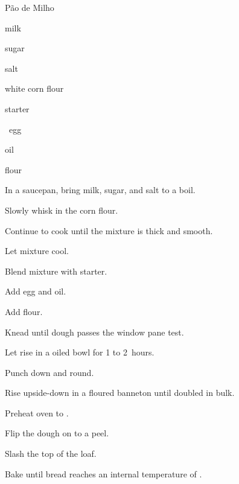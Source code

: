 \begin{recipe}{P\~ao de Milho}{}{}

\begin{ingredients}
\item {} milk
\item \C{\quarter} sugar
\item {} salt
\item {} white corn flour
\item {} starter
\item \half{}~egg
\item {} oil
\item {} flour
\end{ingredients}

\begin{directions}
\item In a saucepan, bring milk, sugar, and salt to a boil.
\item Slowly whisk in the corn flour.
\item Continue to cook until the mixture is thick and smooth.
\item Let mixture cool.
\item Blend mixture with starter.
\item Add egg and oil.
\item Add flour.
\item Knead until dough passes the window pane test.
\item Let rise in a oiled bowl for 1 to 2~hours.
\item Punch down and round.
\item Rise upside-down in a floured banneton until doubled in bulk.
\item Preheat oven to .
\item Flip the dough on to a peel.
\item Slash the top of the loaf.
\item Bake until bread reaches an internal temperature of .
\end{directions}

\end{recipe}
